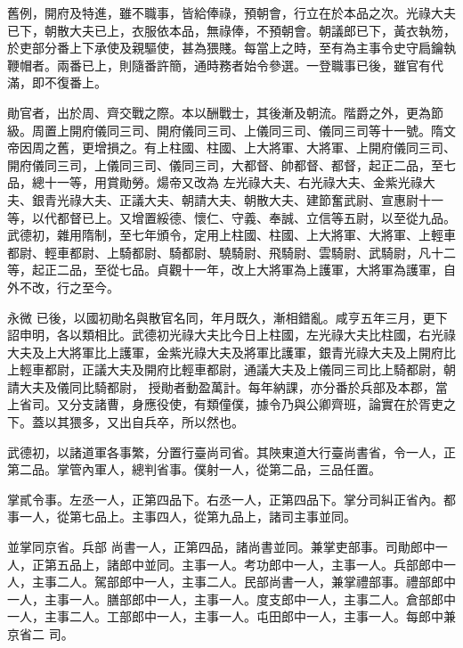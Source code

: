 \begin{pinyinscope}
 舊例，開府及特進，雖不職事，皆給俸祿，預朝會，行立在於本品之次。光祿大夫已下，朝散大夫已上，衣服依本品，無祿俸，不預朝會。朝議郎已下，黃衣執笏，於吏部分番上下承使及親驅使，甚為猥賤。每當上之時，至有為主事令史守扃鑰執
 鞭帽者。兩番已上，則隨番許簡，通時務者始令參選。一登職事已後，雖官有代滿，即不復番上。



 勛官者，出於周、齊交戰之際。本以酬戰士，其後漸及朝流。階爵之外，更為節級。周置上開府儀同三司、開府儀同三司、上儀同三司、儀同三司等十一號。隋文帝因周之舊，更增損之。有上柱國、柱國、上大將軍、大將軍、上開府儀同三司、開府儀同三司，上儀同三司、儀同三司，大都督、帥都督、都督，起正二品，至七品，總十一等，用賞勛勞。煬帝又改為
 左光祿大夫、右光祿大夫、金紫光祿大夫、銀青光祿大夫、正議大夫、朝請大夫、朝散大夫、建節奮武尉、宣惠尉十一等，以代都督已上。又增置綏德、懷仁、守義、奉誠、立信等五尉，以至從九品。武德初，雜用隋制，至七年頒令，定用上柱國、柱國、上大將軍、大將軍、上輕車都尉、輕車都尉、上騎都尉、騎都尉、驍騎尉、飛騎尉、雲騎尉、武騎尉，凡十二等，起正二品，至從七品。貞觀十一年，改上大將軍為上護軍，大將軍為護軍，自外不改，行之至今。



 永微
 已後，以國初勛名與散官名同，年月既久，漸相錯亂。咸亨五年三月，更下詔申明，各以類相比。武德初光祿大夫比今日上柱國，左光祿大夫比柱國，右光祿大夫及上大將軍比上護軍，金紫光祿大夫及將軍比護軍，銀青光祿大夫及上開府比上輕車都尉，正議大夫及開府比輕車都尉，通議大夫及上儀同三司比上騎都尉，朝請大夫及儀同比騎都尉，
 授勛者動盈萬計。每年納課，亦分番於兵部及本郡，當上省司。又分支諸曹，身應役使，有類僮僕，據令乃與公卿齊班，論實在於胥吏之下。蓋以其猥多，又出自兵卒，所以然也。



 武德初，以諸道軍各事繁，分置行臺尚司省。其陜東道大行臺尚書省，令一人，正第二品。掌管內軍人，總判省事。僕射一人，從第二品，三品任置。



 掌貳令事。左丞一人，正第四品下。右丞一人，正第四品下。掌分司糾正省內。都事一人，從第七品上。主事四人，從第九品上，諸司主事並同。



 並掌同京省。兵部
 尚書一人，正第四品，諸尚書並同。兼掌吏部事。司勛郎中一人，正第五品上，諸郎中並同。主事一人。考功郎中一人，主事一人。兵部郎中一人，主事二人。駕部郎中一人，主事二人。民部尚書一人，兼掌禮部事。禮部郎中一人，主事一人。膳部郎中一人，主事一人。度支郎中一人，主事二人。倉部郎中一人，主事二人。工部郎中一人，主事一人。屯田郎中一人，主事一人。每郎中兼京省二
 司。




\end{pinyinscope}
